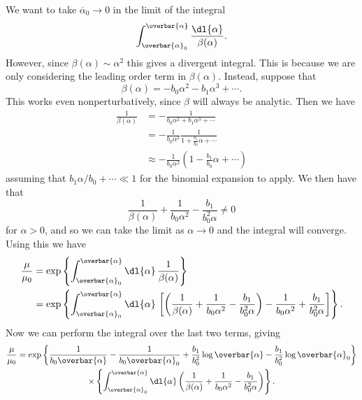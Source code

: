 \documentclass[fleqn]{NotesClass}
\begin{document}
    We want to take \(\overbar{\alpha}_0 \to 0\) in the limit of the integral
    \begin{equation}
        \int_{\overbar{\alpha}_0}^{\overbar{\alpha}} \frac{\dl{\alpha}}{\beta(\alpha)}.
    \end{equation}
    However, since \(\beta(\alpha) \sim \alpha^2\) this gives a divergent integral.
    This is because we are only considering the leading order term in \(\beta(\alpha)\).
    Instead, suppose that
    \begin{equation}
        \beta(\alpha) = -b_0\alpha^2 - b_1 \alpha^3 + \dotsb.
    \end{equation}
    This works even nonperturbatively, since \(\beta\) will always be analytic.
    Then we have
    \begin{align}
        \frac{1}{\beta(\alpha)} &= -\frac{1}{b_0\alpha^2 + b_1\alpha^3 + \dotsb}\\
        &= -\frac{1}{b_0\alpha^2} \frac{1}{1 + \frac{b_1}{b_0}\alpha + \dotsb}\\
        &\approx - \frac{1}{b_0\alpha^2} \left( 1 - \frac{b_1}{b_0}\alpha + \dotsb \right)
    \end{align}
    assuming that \(b_1\alpha/b_0 + \dotsb \ll 1\) for the binomial expansion to apply.
    We then have that
    \begin{equation}
        \frac{1}{\beta(\alpha)} + \frac{1}{b_0\alpha^2} - \frac{b_1}{b_0^2\alpha} \ne 0
    \end{equation}
    for \(\alpha > 0\), and so we can take the limit as \(\alpha \to 0\) and the integral will converge.
    Using this we have
    \begin{align}
        \frac{\mu}{\mu_0} &= \exp\left\{ \int_{\overbar{\alpha}_0}^{\overbar{\alpha}} \dl{\alpha} \, \frac{1}{\beta(\alpha)} \right\}\\
        &= \exp\left\{  \int_{\overbar{\alpha}_0}^{\overbar{\alpha}} \dl{\alpha} \, \left[ \left( \frac{1}{\beta(\alpha)} + \frac{1}{b_0\alpha^2} - \frac{b_1}{b_0^2\alpha} \right) - \frac{1}{b_0\alpha^2} + \frac{b_1}{b_0^2\alpha} \right] \right\}.
    \end{align}
    Now we can perform the integral over the last two terms, giving
    \begin{multline}
        \frac{\mu}{\mu_0} =
        \exp\left\{ \frac{1}{b_0\overbar{\alpha}} - \frac{1}{b_0\overbar{\alpha}_0} + \frac{b_1}{b_0^2} \log\overbar{\alpha} - \frac{b_1}{b_0^2} \log\overbar{\alpha}_0 \right\}\\
        \times \left\{ \int_{\overbar{\alpha}_0}^{\overbar{\alpha}} \dl{\alpha} \left( \frac{1}{\beta(\alpha)} + \frac{1}{b_0\alpha^2} - \frac{b_1}{b_0^2\alpha} \right) \right\}.
    \end{multline}
\end{document}
